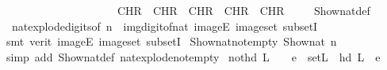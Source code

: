 \begin{isabellebody}
\ \ \ \ \ \ \ \ \ \ \ \ \ \ \ \ \ \ \ \ \ CHR\ {\isacharprime}{\kern0pt}{\isacharprime}{\kern0pt}{}{\isacharprime}{\kern0pt}{\isacharprime}{\kern0pt}{\isacharcomma}{\kern0pt}\ CHR\ {\isacharprime}{\kern0pt}{\isacharprime}{\kern0pt}{}{\isacharprime}{\kern0pt}{\isacharprime}{\kern0pt}{\isacharcomma}{\kern0pt}\ CHR\ {\isacharprime}{\kern0pt}{\isacharprime}{\kern0pt}{}{\isacharprime}{\kern0pt}{\isacharprime}{\kern0pt}{\isacharcomma}{\kern0pt}\ CHR\ {\isacharprime}{\kern0pt}{\isacharprime}{\kern0pt}{}{\isacharprime}{\kern0pt}{\isacharprime}{\kern0pt}{\isacharcomma}{\kern0pt}\ CHR\ {\isacharprime}{\kern0pt}{\isacharprime}{\kern0pt}{}{\isacharprime}{\kern0pt}{\isacharprime}{\kern0pt}{\isacharbraceright}{\kern0pt}{\isacartoucheclose}\isanewline
%
\isadelimproof
\ \ %
\endisadelimproof
%
\isatagproof
{}\isamarkupfalse%
\ Show\isactrlsub n\isactrlsub a\isactrlsub t{\isacharunderscore}{\kern0pt}def\isanewline
\ \ \isamarkupfalse%
\ \ nat{\isacharunderscore}{\kern0pt}explode{\isacharunderscore}{\kern0pt}digits{\isacharbrackleft}{\kern0pt}of\ n{\isacharbrackright}{\kern0pt}\ \ img{\isacharunderscore}{\kern0pt}digit{\isacharunderscore}{\kern0pt}of{\isacharunderscore}{\kern0pt}nat\ imageE\ image{\isacharunderscore}{\kern0pt}set\ subsetI\isanewline
\ \ \isamarkupfalse%
\ {\isacharparenleft}{\kern0pt}smt\ {\isacharparenleft}{\kern0pt}verit{\isacharparenright}{\kern0pt}\ imageE\ image{\isacharunderscore}{\kern0pt}set\ subsetI{\isacharparenright}{\kern0pt}%
\endisatagproof
{\isafoldproof}%
%
\isadelimproof
\isanewline
%
\endisadelimproof
\isanewline
{}\isamarkupfalse%
\ Show{\isacharunderscore}{\kern0pt}nat{\isacharunderscore}{\kern0pt}not{\isacharunderscore}{\kern0pt}empty{\isacharcolon}{\kern0pt}\ {\isacartoucheopen}{\isacharparenleft}{\kern0pt}Show\isactrlsub n\isactrlsub a\isactrlsub t\ n{\isacharparenright}{\kern0pt}\ {\isasymnoteq}\ {\isacharbrackleft}{\kern0pt}{\isacharbrackright}{\kern0pt}{\isacartoucheclose}\isanewline
%
\isadelimproof
\ \ %
\endisadelimproof
%
\isatagproof
{}\isamarkupfalse%
\ {\isacharparenleft}{\kern0pt}simp\ add{\isacharcolon}{\kern0pt}\ Show\isactrlsub n\isactrlsub a\isactrlsub t{\isacharunderscore}{\kern0pt}def\ nat{\isacharunderscore}{\kern0pt}explode{\isacharunderscore}{\kern0pt}not{\isacharunderscore}{\kern0pt}empty{\isacharparenright}{\kern0pt}%
\endisatagproof
{\isafoldproof}%
%
\isadelimproof
\isanewline
%
\endisadelimproof
\isanewline
{}\isamarkupfalse%
\ not{\isacharunderscore}{\kern0pt}hd{\isacharcolon}{\kern0pt}\ {\isacartoucheopen}L\ {\isasymnoteq}\ {\isacharbrackleft}{\kern0pt}{\isacharbrackright}{\kern0pt}\ {\isasymLongrightarrow}\ e\ {\isasymnotin}\ set{\isacharparenleft}{\kern0pt}L{\isacharparenright}{\kern0pt}\ {\isasymLongrightarrow}\ hd\ L\ {\isasymnoteq}\ e{\isacartoucheclose}\isanewline

\end{isabellebody}
